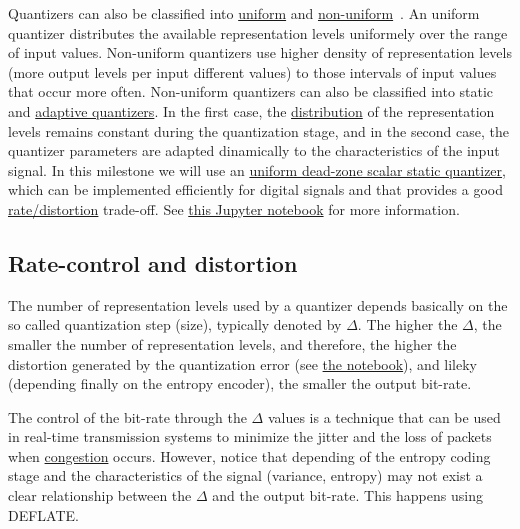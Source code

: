 Quantizers can also be classified into
\href{https://en.wikipedia.org/wiki/Quantization_(signal_processing)#Mid-riser_and_mid-tread_uniform_quantizers}{uniform}
and
\href{https://nptel.ac.in/content/storage2/courses/117104069/chapter_5/5_5.html}{non-uniform}~\cite{sayood2017introduction,vetterli2014foundations}. An
uniform quantizer distributes the available representation levels
uniformely over the range of input values. Non-uniform quantizers use
higher density of representation levels (more output levels per input
different values) to those intervals of input values that occur more
often. Non-uniform quantizers can also be classified into static and
\href{https://en.wikipedia.org/wiki/Adaptive_differential_pulse-code_modulation}{adaptive
  quantizers}. In the first case, the
\href{https://en.wikipedia.org/wiki/Probability_distribution}{distribution}
of the representation levels remains constant during the quantization
stage, and in the second case, the quantizer parameters are adapted
dinamically to the characteristics of the input signal. In this
milestone we will use an
\href{https://en.wikipedia.org/wiki/Quantization_(signal_processing)#Dead-zone_quantizers}{uniform
  dead-zone scalar static quantizer}, which can be implemented
efficiently for digital signals and that provides a good
\href{https://en.wikipedia.org/wiki/Rate%E2%80%93distortion_theory}{rate/distortion}
  trade-off. See
  \href{https://github.com/vicente-gonzalez-ruiz/quantization/blob/master/digital_quantization.ipynb}{this
    Jupyter notebook} for more information.

\subsection{Rate-control and distortion}
The number of representation levels used by a quantizer depends
basically on the so called quantization step (size), typically denoted by
$\Delta$. The higher the $\Delta$, the smaller the number of
representation levels, and therefore, the higher the distortion
generated by the quantization error (see
\href{https://github.com/vicente-gonzalez-ruiz/quantization/blob/master/digital_quantization.ipynb}{the
  notebook}), and lileky (depending finally on the entropy encoder),
the smaller the output bit-rate.

The control of the bit-rate through the $\Delta$ values is a technique
that can be used in real-time transmission systems to minimize the
jitter and the loss of packets when
\href{https://en.wikipedia.org/wiki/Network_congestion}{congestion}
occurs. However, notice that depending of the entropy coding stage and
the characteristics of the signal (variance, entropy) may not exist a
clear relationship between the $\Delta$ and the output bit-rate. This
happens using DEFLATE.


